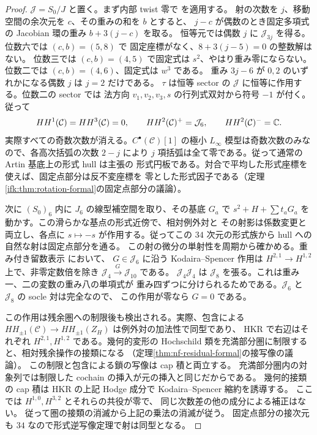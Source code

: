 \begin{proof}
$\mathcal J=S_0/J$ と置く。まず内部 twist 零で
\cite[Theorem~5.39 の証明]{NFBFKKernels}を適用する。
射の次数を $j$、移動空間の余次元を $c$、その重みの和を $b$ とすると、
$j-c$ が偶数のとき固定多項式の Jacobian 環の重み $b+3(j-c)$ を取る。
恒等元では偶数 $j$ に $\mathcal J_{3j}$ を得る。位数六では $(c,b)=(5,8)$ で
固定座標がなく、$8+3(j-5)=0$ の整数解はない。
位数三では $(c,b)=(4,5)$ で固定式は $s^2$、やはり重み零にならない。
位数二では $(c,b)=(4,6)$、固定式は $w^3$ である。
重み $3j-6$ が $0,2$ のいずれかになる偶数 $j$ は $j=2$ だけである。
$\tau$ は恒等 sector の $\mathcal J$ に恒等に作用する。位数二の sector では
法方向 $v_1,v_2,v_3,s$ の行列式双対から符号 $-1$ が付く。従って
\[
  HH^1(\mathcal C)=HH^3(\mathcal C)=0,\qquad
  HH^2(\mathcal C)^+=\mathcal J_6,\qquad
  HH^2(\mathcal C)^-=\mathbb C .
\]
実際すべての奇数次数が消える。$C^\bullet(\mathcal C)[1]$ の極小
$L_\infty$ 模型は奇数次数のみなので、各高次括弧の次数 $2-j$ により
$j$ 項括弧は全て零である。従って通常の Artin 基底上の形式 hull は主張の
形式円板である。対合で平均した形式座標を使えば、固定点部分は反不変座標を
零とした形式因子である（定理\ref{ifk:thm:rotation-formal}の固定点部分の議論）。

次に $(S_0)_6$ 内に $J_6$ の線型補空間を取り、その基底 $G_a$ で
$s^2+H+\sum t_aG_a$ を動かす。この滑らかな基点の形式近傍で、相対例外対と
その射影は係数変更と両立し、各点に $s\mapsto-s$ が作用する。従ってこの
$34$ 次元の形式族から hull への自然な射は固定点部分を通る。
この射の微分の単射性を周期から確かめる。重み付き留数表示
\cite[Lemmas~5.4--5.5]{SignLRZVeronese}において、
$G\in \mathcal J_6$ に沿う Kodaira--Spencer 作用は
$H^{2,1}\to H^{1,2}$ 上で、非零定数倍を除き
$\mathcal J_4\xrightarrow{G}\mathcal J_{10}$ である。
$\mathcal J_4 \mathcal J_4$ は $\mathcal J_8$ を張る。これは重み一、二の変数の重み八の単項式が
重み四ずつに分けられるためである。$\mathcal J_6$ と $\mathcal J_8$ の socle 対は完全なので、
この作用が零なら $G=0$ である。

この作用は残余圏への制限後も検出される。実際、包含による
$HH_{\pm1}(\mathcal C)\to HH_{\pm1}(Z_H)$ は例外対の加法性で同型であり、
HKR で右辺はそれぞれ $H^{2,1},H^{1,2}$ である。幾何的変形の
Hochschild 類を充満部分圏に制限すると、相対残余操作の接類になる
（定理\ref{thm:nf-residual-formal}の接写像の議論）。
この制限と包含による鎖の写像は cap 積と両立する。
充満部分圏内の対象列では制限した cochain の挿入が元の挿入と同じだからである。
幾何的接類の cap 積は HKR の上記 Hodge 成分で Kodaira--Spencer 縮約を誘導する。
ここでは $H^{1,0},H^{3,2}$ とそれらの共役が零で、
同じ次数差の他の成分による補正はない。
従って圏の接類の消滅から上記の乗法の消滅が従う。
固定点部分の接次元も $34$ なので形式逆写像定理で射は同型となる。


\end{proof}
